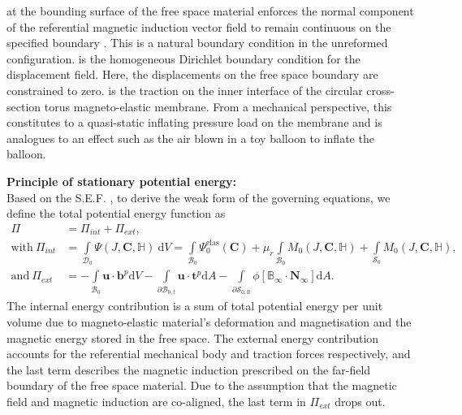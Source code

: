 \documentclass[11pt,a4paper,final]{article}
\begin{document}
 at the bounding surface of the free space material enforces the normal component of the referential magnetic induction vector field to remain continuous on the specified boundary \cite{Pelteret2016}. This is a natural boundary condition in the unreformed configuration.  is the homogeneous Dirichlet boundary condition for the displacement field. Here, the displacements on the free space boundary are constrained to zero.  is the traction on the inner interface of the circular cross-section torus magneto-elastic membrane. From a mechanical perspective, this constitutes to a quasi-static inflating pressure load on the membrane and is analogues to an effect such as the air blown in a toy balloon to inflate the balloon. \newline \par 

\noindent \textbf{Principle of stationary potential energy:} \\
Based on the S.E.F. , to derive the weak form of the governing equations, we define the total potential energy function as
\begin{align}
\Pi &= \Pi_{int} + \Pi_{ext}, \\
\text{with} \ \Pi_{int} &= \int\limits_{\mathcal{D}_0} \Psi (J, \mathbf{C}, \mathbb{H}) \ \mathrm{d}V = \int\limits_{\mathcal{B}_0} \Psi_0^{\text{elas}} (\mathbf{C}) + \mu_r \int\limits_{\mathcal{B}_0} M_0 (J, \mathbf{C}, \mathbb{H}) + \int\limits_{\mathcal{S}_0} M_0 (J, \mathbf{C}, \mathbb{H}), \label{eq:3.24.1}\\
\text{and} \ \Pi_{ext} &= -\int\limits_{\mathcal{B}_0} \mathbf{u} \cdot \mathbf{b}^p \mathrm{d} V - \int\limits_{\partial \mathcal{B}_{0,t}} \mathbf{u} \cdot \mathbf{t}^p \mathrm{d}A -\int\limits_{\partial \mathcal{S}_{0,\mathbb{B}}} \phi \left[ \mathbb{B}_{\infty} \cdot \mathbf{N}_{\infty} \right] \mathrm{d}A.  
\label{eq:3.24.2}
\end{align}
The internal energy contribution  is a sum of total potential energy per unit volume due to magneto-elastic material's deformation and magnetisation and the magnetic energy stored in the free space. The external energy contribution  accounts for the referential mechanical body and traction forces respectively, and the last term describes the magnetic induction prescribed on the far-field boundary of the free space material. Due to the assumption that the magnetic field and magnetic induction are co-aligned, the last term in $\Pi_{ext}$ drops out. \par 
\end{document}
